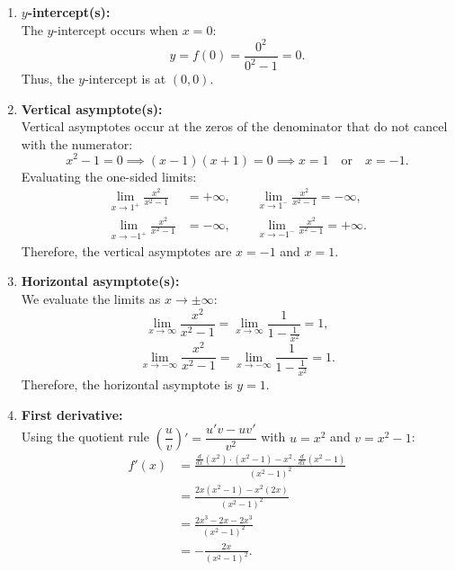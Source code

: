 \documentclass[11pt,a4paper]{article}
\begin{document}
\begin{enumerate}
\begin{enumerate}
          \item \textbf{$y$-intercept(s):}\\
                The $y$-intercept occurs when $x = 0$:
                \[
                  y = f(0) = \frac{0^2}{0^2 - 1} = 0.
                \]
                Thus, the $y$-intercept is at $\boxed{(0, 0)}$.

          \item \textbf{Vertical asymptote(s):}\\
                Vertical asymptotes occur at the zeros of the denominator that do not cancel with the numerator:
                \[
                  x^2 - 1 = 0 \implies (x - 1)(x + 1) = 0 \implies x = 1 \quad\text{or}\quad x = -1.
                \]
                Evaluating the one-sided limits:
                \begin{align*}
                  \lim_{x \to 1^+} \frac{x^2}{x^2 - 1}  & = +\infty, \qquad \lim_{x \to 1^-} \frac{x^2}{x^2 - 1} = -\infty,  \\
                  \lim_{x \to -1^+} \frac{x^2}{x^2 - 1} & = -\infty, \qquad \lim_{x \to -1^-} \frac{x^2}{x^2 - 1} = +\infty.
                \end{align*}
                Therefore, the vertical asymptotes are $\boxed{x = -1}$ and $\boxed{x = 1}$.

          \item \textbf{Horizontal asymptote(s):}\\
                We evaluate the limits as $x \to \pm\infty$:
                \[
                  \lim_{x \to \infty} \frac{x^2}{x^2 - 1} = \lim_{x \to \infty} \frac{1}{1 - \frac{1}{x^2}} = 1,
                \]
                \[
                  \lim_{x \to -\infty} \frac{x^2}{x^2 - 1} = \lim_{x \to -\infty} \frac{1}{1 - \frac{1}{x^2}} = 1.
                \]
                Therefore, the horizontal asymptote is $\boxed{y = 1}$.

          \item \textbf{First derivative:}\\
                Using the quotient rule $\left(\dfrac{u}{v}\right)' = \dfrac{u'v - uv'}{v^2}$ with $u = x^2$ and $v = x^2 - 1$:
                \begin{align*}
                  f'(x) & = \frac{\frac{d}{dx}(x^2)\cdot(x^2 - 1) - x^2\cdot\frac{d}{dx}(x^2 - 1)}{(x^2 - 1)^2} \\
                        & = \frac{2x(x^2 - 1) - x^2(2x)}{(x^2 - 1)^2}                                           \\
                        & = \frac{2x^3 - 2x - 2x^3}{(x^2 - 1)^2}                                                \\
                        & = \boxed{-\frac{2x}{(x^2 - 1)^2}}.
                \end{align*}


\end{enumerate}
\end{enumerate}
\end{document}
